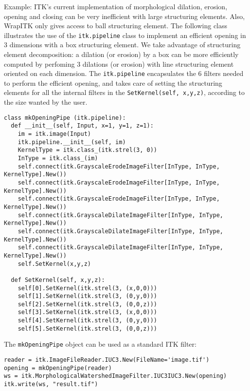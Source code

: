 \documentclass{InsightArticle}
\begin{document}
\begin{itemize}
\begin{itemize}
\end{itemize}

Example:
ITK's current implementation of morphological dilation, erosion, opening and closing
can be very inefficient with large structuring elements. Also, WrapITK only gives
access to ball structuring element. The following class illustrates the use of the
\verb$itk.pipeline$ class to implement an efficient opening in 3 dimensions with
a box structuring element. We take advantage of structuring element decomposition:
a dilation (or erosion) by a box can be more efficiently computed by perfoming
3 dilations (or erosion) with line structuring element oriented on each dimension.
The \verb$itk.pipeline$ encapsulates the 6 filters needed to perform the efficient
opening, and takes care of setting the structuring elements for all the internal
filters in the \verb$SetKernel(self, x,y,z)$, according to the size wanted by the
user.

\begin{verbatim}
class mkOpeningPipe (itk.pipeline):
  def __init__(self, Input, x=1, y=1, z=1):
    im = itk.image(Input)
    itk.pipeline.__init__(self, im)
    KernelType = itk.class_(itk.strel(3, 0))
    InType = itk.class_(im)
    self.connect(itk.GrayscaleErodeImageFilter[InType, InType, KernelType].New())
    self.connect(itk.GrayscaleErodeImageFilter[InType, InType, KernelType].New())
    self.connect(itk.GrayscaleErodeImageFilter[InType, InType, KernelType].New())
    self.connect(itk.GrayscaleDilateImageFilter[InType, InType, KernelType].New())
    self.connect(itk.GrayscaleDilateImageFilter[InType, InType, KernelType].New())
    self.connect(itk.GrayscaleDilateImageFilter[InType, InType, KernelType].New())
    self.SetKernel(x,y,z)

  def SetKernel(self, x,y,z):
    self[0].SetKernel(itk.strel(3, (x,0,0)))
    self[1].SetKernel(itk.strel(3, (0,y,0)))
    self[2].SetKernel(itk.strel(3, (0,0,z)))
    self[3].SetKernel(itk.strel(3, (x,0,0)))
    self[4].SetKernel(itk.strel(3, (0,y,0)))
    self[5].SetKernel(itk.strel(3, (0,0,z)))
\end{verbatim}

The \verb$mkOpeningPipe$ object can be used as a standard ITK filter:

\begin{verbatim}
reader = itk.ImageFileReader.IUC3.New(FileName='image.tif')
opening = mkOpeningPipe(reader)
ws = itk.MorphologicalWatershedImageFilter.IUC3IUC3.New(opening)
itk.write(ws, "result.tif")
\end{verbatim}

\end{itemize}
\end{document}
